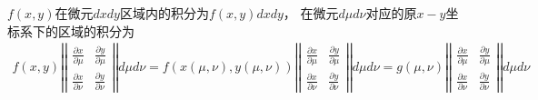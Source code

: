 $f(x,y)$在微元$dxdy$区域内的积分为$f(x,y)dxdy$，
在微元$d\mu d\nu$对应的原$x-y$坐标系下的区域的积分为
\begin{gather}
    f(x,y)
    \left | \left |
    \begin{matrix}
        \frac{\partial x}{\partial \mu} & \frac{\partial y}{\partial \mu}\\
        \frac{\partial x}{\partial \nu} & \frac{\partial y}{\partial \nu}
    \end{matrix}
    \right | \right | d\mu d\nu
    =f(x(\mu,\nu),y(\mu,\nu))
    \left | \left |
    \begin{matrix}
        \frac{\partial x}{\partial \mu} & \frac{\partial y}{\partial \mu}\\
        \frac{\partial x}{\partial \nu} & \frac{\partial y}{\partial \nu}
    \end{matrix}
    \right | \right | d\mu d\nu
    =g(\mu,\nu)
    \left | \left |
    \begin{matrix}
        \frac{\partial x}{\partial \mu} & \frac{\partial y}{\partial \mu}\\
        \frac{\partial x}{\partial \nu} & \frac{\partial y}{\partial \nu}
    \end{matrix}
    \right | \right | d\mu d\nu
\end{gather}
